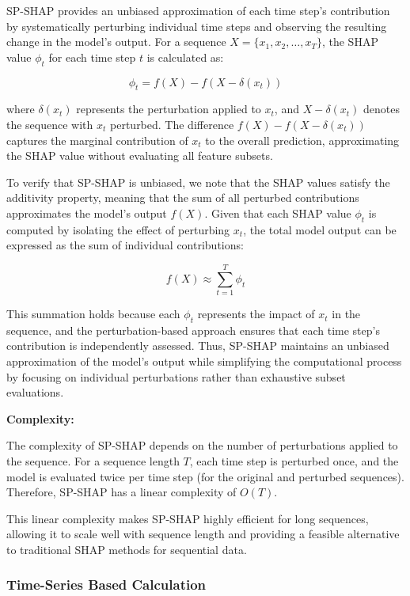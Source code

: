 SP-SHAP provides an unbiased approximation of each time step’s contribution by systematically perturbing individual time steps and observing the resulting change in the model’s output. For a sequence \( X = \{x_1, x_2, \ldots, x_T\} \), the SHAP value \( \phi_t \) for each time step \( t \) is calculated as:

\[
\phi_t = f(X) - f(X - \delta(x_t))
\]

where \( \delta(x_t) \) represents the perturbation applied to \( x_t \), and \( X - \delta(x_t) \) denotes the sequence with \( x_t \) perturbed. The difference \( f(X) - f(X - \delta(x_t)) \) captures the marginal contribution of \( x_t \) to the overall prediction, approximating the SHAP value without evaluating all feature subsets.

To verify that SP-SHAP is unbiased, we note that the SHAP values satisfy the additivity property, meaning that the sum of all perturbed contributions approximates the model’s output \( f(X) \). Given that each SHAP value \( \phi_t \) is computed by isolating the effect of perturbing \( x_t \), the total model output can be expressed as the sum of individual contributions:

\[
f(X) \approx \sum_{t=1}^{T} \phi_t
\]

This summation holds because each \( \phi_t \) represents the impact of \( x_t \) in the sequence, and the perturbation-based approach ensures that each time step’s contribution is independently assessed. Thus, SP-SHAP maintains an unbiased approximation of the model’s output while simplifying the computational process by focusing on individual perturbations rather than exhaustive subset evaluations.

\textbf{Complexity:}

The complexity of SP-SHAP depends on the number of perturbations applied to the sequence. For a sequence length \( T \), each time step is perturbed once, and the model is evaluated twice per time step (for the original and perturbed sequences). Therefore, SP-SHAP has a linear complexity of \( O(T) \).

This linear complexity makes SP-SHAP highly efficient for long sequences, allowing it to scale well with sequence length and providing a feasible alternative to traditional SHAP methods for sequential data.

\subsubsection{Time-Series Based Calculation}

